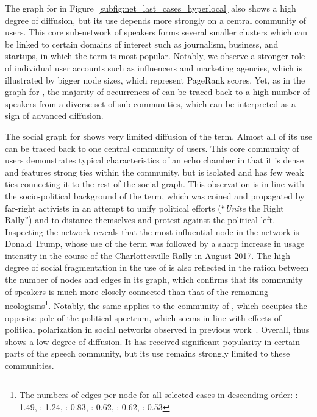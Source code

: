 \documentclass[
  a4paper,
  abstract=on,
  captions=tableabove
  ]{scrartcl}
\begin{document}
      The graph for  in Figure~\ref{subfig:net_last_cases_hyperlocal} also shows a high degree of diffusion, but its use depends more strongly on a central community of users. This core sub-network of speakers forms several smaller clusters which can be linked to certain domains of interest such as journalism, business, and startups, in which the term is most popular. Notably, we observe a stronger role of individual user accounts such as influencers and marketing agencies, which is illustrated by bigger node sizes, which represent PageRank scores. Yet, as in the graph for , the majority of occurrences of  can be traced back to a high number of speakers from a diverse set of sub-communities, which can be interpreted as a sign of advanced diffusion.

      The social graph for  shows very limited diffusion of the term. Almost all of its use can be traced back to one central community of users. This core community of users demonstrates typical characteristics of an echo chamber in that it is dense and features strong ties within the community, but is isolated and has few weak ties connecting it to the rest of the social graph. This observation is in line with the socio-political background of the term, which was coined and propagated by far-right activists in an attempt to unify political efforts (\enquote{\emph{Unite} the Right Rally}) and to distance themselves and protest against the political left. Inspecting the network reveals that the most influential node in the network is Donald Trump, whose use of the term was followed by a sharp increase in usage intensity in the course of the Charlottesville Rally in August 2017. The high degree of social fragmentation in the use of  is also reflected in the ration between the number of nodes and edges in its graph, which confirms that its community of speakers is much more closely connected than that of the remaining neologisms\footnote{The numbers of edges per node for all selected cases in descending order: : \num{1.49}, : \num{1.24}, : \num{0.83}, : \num{0.62}, : \num{0.62}, : \num{0.53}}. Notably, the same applies to the community of , which occupies the opposite pole of the political spectrum, which seems in line with effects of political polarization in social networks observed in previous work~\parencite{Sunstein2018RepublicDivided}. Overall,  thus shows a low degree of diffusion. It has received significant popularity in certain parts of the speech community, but its use remains strongly limited to these communities.
\end{document}
